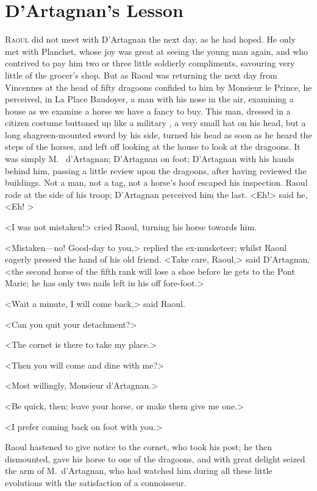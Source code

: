 \chapter{D'Artagnan's Lesson}

\lettrine{R}{aoul} did not meet with D'Artagnan the next day, as he had hoped. He only met with Planchet, whose joy was great at seeing the young man again, and who contrived to pay him two or three little soldierly compliments, savouring very little of the grocer's shop. But as Raoul was returning the next day from Vincennes at the head of fifty dragoons confided to him by Monsieur le Prince, he perceived, in La Place Baudoyer, a man with his nose in the air, examining a house as we examine a horse we have a fancy to buy. This man, dressed in a citizen costume buttoned up like a military , a very small hat on his head, but a long shagreen-mounted sword by his side, turned his head as soon as he heard the steps of the horses, and left off looking at the house to look at the dragoons. It was simply M.~ d'Artagnan; D'Artagnan on foot; D'Artagnan with his hands behind him, passing a little review upon the dragoons, after having reviewed the buildings. Not a man, not a tag, not a horse's hoof escaped his inspection. Raoul rode at the side of his troop; D'Artagnan perceived him the last. <Eh!> said he, <Eh! >

<I was not mistaken!> cried Raoul, turning his horse towards him.

<Mistaken—no! Good-day to you,> replied the ex-musketeer; whilst Raoul eagerly pressed the hand of his old friend. <Take care, Raoul,> said D'Artagnan, <the second horse of the fifth rank will lose a shoe before he gets to the Pont Marie; he has only two nails left in his off fore-foot.>

<Wait a minute, I will come back,> said Raoul.

<Can you quit your detachment?>

<The cornet is there to take my place.>

<Then you will come and dine with me?>

<Most willingly, Monsieur d'Artagnan.>

<Be quick, then; leave your horse, or make them give me one.>

<I prefer coming back on foot with you.>

Raoul hastened to give notice to the cornet, who took his post; he then dismounted, gave his horse to one of the dragoons, and with great delight seized the arm of M.~d'Artagnan, who had watched him during all these little evolutions with the satisfaction of a connoisseur.

